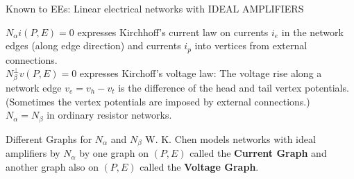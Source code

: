 \documentclass{beamer}
\begin{document}
\begin{frame}{Known to EEs: Linear electrical networks with IDEAL AMPLIFIERS}

  $N_\alpha i(P,E)=0$  expresses Kirchhoff's current law on currents $i_e$ in the network edges (along edge direction)
  and currents $i_p$ into vertices from external connections.\\[.1in]
  $N_\beta^\perp v(P,E)=0$ expresses Kirchoff's voltage law: The voltage rise along a network edge 
  $v_e=v_h-v_t$ is the difference of the head and tail vertex potentials.  (Sometimes the vertex potentials are
  imposed by external connections.)\\[0.1in]
  $N_\alpha=N_\beta$ in ordinary resistor networks.

  \begin{block}{Different Graphs for $N_\alpha$ and $N_\beta$}
    W. K. Chen models networks with ideal amplifiers by $N_\alpha$ by one graph on $(P,E)$ called the
    \textbf{Current Graph} and another graph also on $(P,E)$ called the \textbf{Voltage Graph}.
  \end{block}

\end{frame}
    
\end{document}
